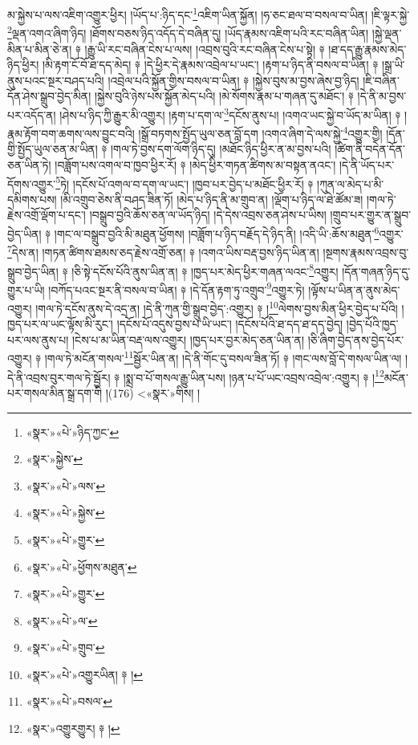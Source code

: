 མ་སྐྱེས་པ་ལས་འཇིག་འགྱུར་ཕྱིར། །ཡོད་པ་:ཉིད་དང་\footnote{«སྣར་»«པེ་»ཉིད་ཀྱང་}འཇིག་ཡིན་སྐྱོན། །ཧ་ཅང་ཐལ་བ་བསལ་བ་ཡིན། །ཇི་ལྟར་སྐྱེ་\footnote{«སྣར་»སྐྱེས་}ལྡན་འགའ་ཞིག་ཉིད། །ཐོགས་བཅས་ཉིད་འདོད་དེ་བཞིན་དུ། །ཡོད་རྣམས་འཇིག་པའི་རང་བཞིན་ཡིན། །སྐྱེ་ལྡན་མིན་པ་མིན་ཅེ་ན། ༈ །རྒྱུ་ཡི་རང་བཞིན་ངེས་པ་ལས། །འབྲས་བུའི་རང་བཞིན་ངེས་པ་སྟེ། ༈ །ཐ་དད་རྒྱུ་རྣམས་མེད་ཉིད་ཕྱིར། །མི་རྟག་ངོ་བོ་ཐ་དད་མེད། ༈ །དེ་ཕྱིར་དེ་རྣམས་འབྲེལ་པ་ཡང་། །རྟག་པ་ཉིད་ནི་བསལ་བ་ཡིན། ༈ །སྒྲ་ཡི་ནུས་པའང་སྔར་བཤད་པའི། །འབྲེལ་པའི་སྐྱོན་གྱིས་བསལ་བ་ཡིན། ༈ །སྐྱེས་བུས་མ་བྱས་ཞེས་བྱ་ཉིད། །ཇི་བཞིན་དོན་ཤེས་སྒྲུབ་བྱེད་མིན། །སྐྱེས་བུའི་ཉེས་པས་སྐྱོན་མེད་པའི། །མེ་སོགས་རྣམ་པ་གཞན་དུ་མཐོང་། ༈ །དེ་ནི་མ་བྱས་པར་འདོད་ན། །ཤེས་པ་ཉིད་ཀྱི་རྒྱུར་མི་འགྱུར། །རྟག་པ་དག་ལ་\footnote{«སྣར་»«པེ་»ལས་}དངོས་ནུས་པ། །འགའ་ཡང་སྐྱེ་བ་ཡོད་མ་ཡིན། ༈ །རྣམ་རྟོག་བག་ཆགས་ལས་བྱུང་བའི། །སྒྲོ་བཏགས་སྤྱོད་ཡུལ་ཅན་བློ་དག །འགའ་ཞིག་དེ་ལས་སྐྱེ་\footnote{«སྣར་»«པེ་»སྐྱེས་}འགྱུར་གྱི། །དོན་གྱི་སྤྱོད་ཡུལ་ཅན་མ་ཡིན། ༈ །གལ་ཏེ་བྱས་དག་ལོག་ཉིད་དུ། །མཐོང་ཉིད་ཕྱིར་ན་མ་བྱས་པའི། །ཚིག་ནི་བདེན་དོན་ཅན་ཡིན་ཏེ། །བཟློག་པས་འགལ་བ་ཁྱབ་ཕྱིར་རོ། ༈ །མེད་ཕྱིར་གཏན་ཚིགས་མ་བསྟན་ནའང་། །དེ་ནི་ཡོད་པར་དོགས་འགྱུར་\footnote{«སྣར་»«པེ་»གྱུར་}ཏེ། །དངོས་པོ་འགལ་བ་དག་ལ་ཡང་། །ཁྱབ་པར་བྱེད་པ་མཐོང་ཕྱིར་རོ། ༈ །ཀུན་ལ་མེད་པ་མི་དམིགས་པས། །མི་འགྲུབ་ཅེས་ནི་བཤད་ཟིན་ཏོ། །མེད་པ་ཉིད་ནི་མ་གྲུབ་ན། །ལྡོག་པ་ཉིད་ལ་ཐེ་ཚོམ་ཟ། །གལ་ཏེ་རྗེས་འགྲོ་ལྡོག་པ་དང་། །བསྒྲུབ་བྱའི་ཆོས་ཅན་ལ་ཡོད་ཉིད། །དེ་དེས་འབྲས་ཅན་ཤེས་པ་ཡིས། །གྲུབ་པར་གྱུར་ན་སྒྲུབ་བྱེད་ཡིན། ༈ །གང་ལ་བསྒྲུབ་བྱའི་མི་མཐུན་ཕྱོགས། །བཟློག་པ་ཉིད་བརྗོད་དེ་ཉིད་ནི། །འདི་ཡི་:ཆོས་མཐུན་\footnote{«སྣར་»«པེ་»ཕྱོགས་མཐུན་}འགྱུར་\footnote{«སྣར་»«པེ་»གྱུར་}དེས་ན། །གཏན་ཚིགས་ཐམས་ཅད་རྗེས་འགྲོ་ཅན། ༈ །འགའ་ཡིས་བརྡ་བྱས་ཉིད་ཡིན་ན། །སྔགས་རྣམས་འབྲས་བུ་སྒྲུབ་བྱེད་ཡིན། ༈ །ཅི་སྟེ་དངོས་པོའི་ནུས་ཡིན་ན། ༈ །ཁྱད་པར་མེད་ཕྱིར་གཞན་ལའང་\footnote{«སྣར་»«པེ་»ལ་}འགྱུར། །དོན་གཞན་ཉིད་དུ་གྱུར་པ་ཡི། །བཀོད་པའང་སྔར་ནི་བསལ་བ་ཡིན། ༈ །དེ་དོན་རྟག་ཏུ་འགྲུབ་\footnote{«སྣར་»«པེ་»གྲུབ་}འགྱུར་ཏེ། །ལྟོས་པ་ཡིན་ན་ནུས་མེད་འགྱུར། །གལ་ཏེ་དངོས་ནུས་དེ་འདྲ་ན། །དེ་ནི་ཀུན་གྱི་སྒྲུབ་བྱེད་:འགྱུར། ༈ །\footnote{«སྣར་»«པེ་»འགྱུརཡིན། ༈ །}ལེགས་བྱས་མིན་ཕྱིར་བྱེད་པ་པོའི། །ཁྱད་པར་ལ་ཡང་ལྟོས་མི་རུང་། །དངོས་པོ་འདུས་བྱས་པ་ཡི་ཡང་། །དངོས་པོའི་ཐ་དད་ཐ་དད་བྱེད། །བྱེད་པོའི་ཁྱད་པར་ལས་ནུས་པ། །ངེས་པ་མ་ཡིན་བརྡ་ལས་འགྱུར། །ཁྱད་པར་བྱར་མེད་ཅན་ཡིན་ན། །ཅི་ཞིག་བྱེད་ནས་བྱེད་པོར་འགྱུར། ༈ །གལ་ཏེ་མངོན་གསལ་\footnote{«སྣར་»«པེ་»བསལ་}སྦྱོར་ཡིན་ན། །དེ་ནི་གོང་དུ་བསལ་ཟིན་ཏོ། ༈ །གང་ལས་བློ་དེ་གསལ་ཡིན་ལ། །དེ་ནི་འབྲས་བུར་གལ་ཏེ་སྦྱོར། ༈ །སྨྲ་བ་པོ་གསལ་རྒྱུ་ཡིན་པས། །ཉན་པ་པོ་ཡང་འབྲས་འབྲེལ་:འགྱུར། ༈ །\footnote{«སྣར་»འགྱུརགྱུར། ༈ །}མངོན་པར་གསལ་མིན་སྒྲ་དག་གི །(176) <«སྣར་»གིས། །
